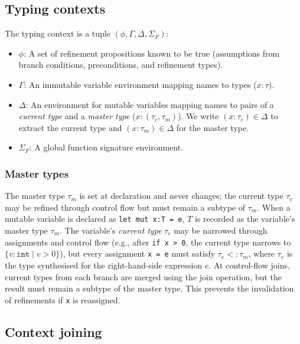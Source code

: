 \subsection{Typing contexts}\label{sec:typing-contexts}

The typing context is a tuple $(\phi, \Gamma, \Delta, \Sigma_F)$:

\begin{itemize}
    \item $\phi$: A set of refinement propositions known to be true (assumptions from branch conditions, preconditions, and refinement types).
    \item $\Gamma$: An immutable variable environment mapping names to types ($x : \tau$).
    \item $\Delta$: An environment for mutable variables mapping names to pairs of a \textit{current type} and a \textit{master type} ($x : (\tau_c, \tau_m)$). We write $(x: \tau_c) \in \Delta$ to extract the current type and $(x: \tau_m) \in \Delta$ for the master type.
    \item $\Sigma_F$: A global function signature environment.
\end{itemize}

\subsubsection{Master types}

The master type $\tau_m$ is set at declaration and never changes; the current type $\tau_c$ may be refined through control flow but must remain a subtype of $\tau_m$. When a mutable variable is declared as \texttt{let mut x:T = e}, $T$ is recorded as the variable's master type $\tau_m$. The variable's \textit{current type} $\tau_c$ may be narrowed through assignments and control flow (e.g., after \texttt{if x > 0}, the current type narrows to $\{v\!:\!\mathtt{int} \mid v > 0\}$), but every assignment \texttt{x = e} must satisfy $\tau_e <: \tau_m$, where $\tau_e$ is the type synthesised for the right-hand-side expression $e$. At control-flow joins, current types from each branch are merged using the join operation, but the result must remain a subtype of the master type. This prevents the invalidation of refinements if \texttt{x} is reassigned. 

\subsection{Context joining}\label{sec:context-joining}

